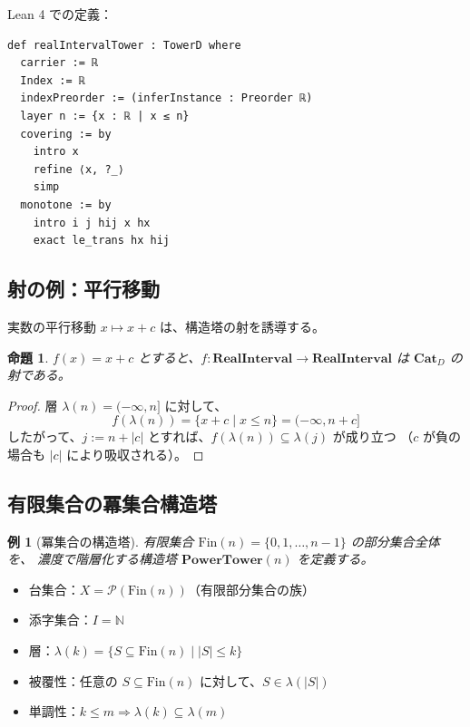 \documentclass[a4paper,12pt]{ltjsarticle}
\newtheorem{proposition}[theorem]{命題}
\newtheorem{example}[theorem]{例}
\newcommand{\N}{\mathbb{N}}
\begin{document}
Lean 4 での定義：

\begin{verbatim}
def realIntervalTower : TowerD where
  carrier := ℝ
  Index := ℝ
  indexPreorder := (inferInstance : Preorder ℝ)
  layer n := {x : ℝ | x ≤ n}
  covering := by
    intro x
    refine ⟨x, ?_⟩
    simp
  monotone := by
    intro i j hij x hx
    exact le_trans hx hij
\end{verbatim}

\subsection{射の例：平行移動}

実数の平行移動 $x \mapsto x + c$ は、構造塔の射を誘導する。

\begin{proposition}
$f(x) = x + c$ とすると、$f: \mathbf{RealInterval} \to \mathbf{RealInterval}$ は
$\mathbf{Cat}_D$ の射である。
\end{proposition}

\begin{proof}
層 $\lambda(n) = (-\infty, n]$ に対して、
\begin{equation*}
f(\lambda(n)) = \{x + c \mid x \leq n\} = (-\infty, n + c]
\end{equation*}
したがって、$j := n + |c|$ とすれば、$f(\lambda(n)) \subseteq \lambda(j)$ が成り立つ
（$c$ が負の場合も $|c|$ により吸収される）。
\end{proof}

\subsection{有限集合の冪集合構造塔}

\begin{example}[冪集合の構造塔]
\label{ex:powerset}
有限集合 $\text{Fin}(n) = \{0, 1, \ldots, n-1\}$ の部分集合全体を、
濃度で階層化する構造塔 $\mathbf{PowerTower}(n)$ を定義する。
\end{example}

\begin{itemize}
  \item 台集合：$X = \mathcal{P}(\text{Fin}(n))$（有限部分集合の族）
  \item 添字集合：$I = \N$
  \item 層：$\lambda(k) = \{S \subseteq \text{Fin}(n) \mid |S| \leq k\}$
  \item 被覆性：任意の $S \subseteq \text{Fin}(n)$ に対して、$S \in \lambda(|S|)$
  \item 単調性：$k \leq m \Rightarrow \lambda(k) \subseteq \lambda(m)$
\end{itemize}
\end{document}

